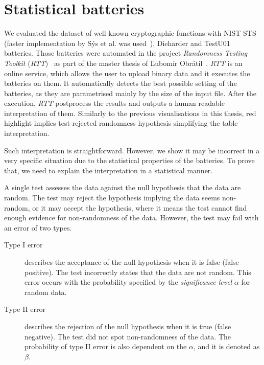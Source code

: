\documentclass[
    digital,    %
    oneside,    %
    color,
    11pt,
    nocover,
    notable,
    nolof,
    nolot,
]{fithesis3}
\begin{document}
\section{Statistical batteries}
\label{sec:relatwork-stat}

We evaluated the dataset of well-known cryptographic functions with NIST STS (faster implementation by Sýs et al. was used~\cite{sys2016algorithm}), Dieharder and TestU01 batteries. Those batteries were automated in the project \textit{Randomness Testing Toolkit} (\textit{RTT})~\cite{rttgit} as part of the master thesis of Ľubomír Obrátil~\cite{obratilMgrThesis}. \textit{RTT} is an online service, which allows the user to upload binary data and it executes the batteries on them. It automatically detects the best possible setting of the batteries, as they are parametrised mainly by the size of the input file. After the execution, \textit{RTT} postprocess the results and outputs a human readable interpretation of them. Similarly to the previous visualisations in this thesis, red highlight implies test rejected randomness hypothesis simplifying the table interpretation.

Such interpretation is straightforward. However, we show it may be incorrect in a very specific situation due to the statistical properties of the batteries. To prove that, we need to explain the interpretation in a statistical manner.

A single test assesses the data against the null hypothesis that the data are random. The test may reject the hypothesis implying the data seems non-random, or it may accept the hypothesis, where it means the test cannot find enough evidence for non-randomness of the data. However, the test may fail with an error of two types.

\begin{description}
    \item[Type I error] describes the acceptance of the null hypothesis when it is false (false positive). The test incorrectly states that the data are not random. This error occurs with the probability specified by the \textit{significance level} $\alpha$ for random data.
    \item[Type II error] describes the rejection of the null hypothesis when it is true (false negative). The test did not spot non-randomness of the data. The probability of type II error is also dependent on the $\alpha$, and it is denoted as $\beta$.
\end{description}
\end{document}
